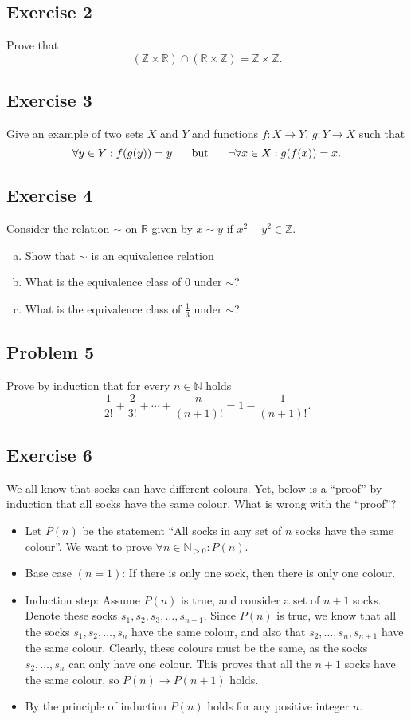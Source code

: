 \documentclass{amsart}
\newcommand{\Z}{\mathbb{Z}}
\newcommand{\N}{\mathbb{N}}
\newcommand{\R}{\mathbb{R}}
\theoremstyle{definition} \newtheorem*{definition}{Definition}
\theoremstyle{remark} \newtheorem*{ex}{Example}
\begin{document}
\subsection*{Exercise 2}
Prove that $$(\Z\times \R)\cap (\R\times \Z) = \Z\times \Z.$$

\subsection*{Exercise 3}
Give an example of two sets $X$ and $Y$ and functions $f:X\to Y$, $g:Y\to X$ such that $$\forall y\in Y: f(g(y))=y\hspace{0.5cm}\mbox{ but }\hspace{0.5cm}\neg \forall x\in X : g(f(x))=x.$$ 

\subsection*{Exercise 4}
Consider the relation $\sim$ on $\R$ given by $x\sim y$ if $x^2-y^2\in\Z$.
\begin{enumerate}[a)]
\item Show that $\sim$ is an equivalence relation
\item What is the equivalence class of $0$ under $\sim$?
\item What is the equivalence class of $\frac{1}{3}$ under $\sim$?
\end{enumerate}


\subsection*{Problem 5}
Prove by induction that for every $n\in\N$ holds $$\frac{1}{2!}+\frac{2}{3!} + \cdots + \frac{n}{(n+1)!} = 1-\frac{1}{(n+1)!}.$$

\subsection*{Exercise 6}
We all know that socks can have different colours. Yet, below is a ``proof'' by induction that all socks have the same colour. What is wrong with the ``proof''?
\begin{itemize}
\item Let $P(n)$ be the statement ``All socks in any set of $n$ socks have the same colour''. We want to prove $\forall n\in\N_{>0}: P(n)$.
\item Base case $(n=1)$: If there is only one sock, then there is only one colour.
\item Induction step: Assume $P(n)$ is true, and consider a set of $n+1$ socks. Denote these socks $s_1, s_2, s_3,\dots , s_{n+1}$. Since $P(n)$ is true, we know that all the socks  $s_1, s_2, \dots , s_n$ have the same colour, and also that $s_2,\dots, s_n, s_{n+1}$  have the same colour. Clearly, these colours must be the same, as the socks $s_2,\dots, s_n$ can only have one colour. This proves that all the $n+1$ socks have the same colour, so $P(n)\to P(n+1)$ holds.
\item By the principle of induction $P(n)$ holds for any positive integer $n$.
\end{itemize}
\end{document}
